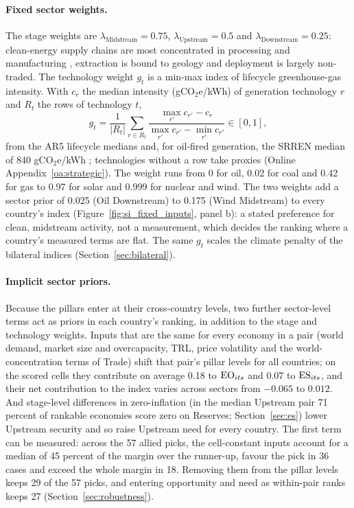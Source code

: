 \paragraph{Fixed sector weights.} The stage weights are $\lambda_{\mathrm{Midstream}}=0.75$,
$\lambda_{\mathrm{Upstream}}=0.5$ and $\lambda_{\mathrm{Downstream}}=0.25$: clean-energy supply chains
are most concentrated in processing and manufacturing \citep{iea2021role,iea2024etp}, extraction is
bound to geology and deployment is largely non-traded. The technology weight $g_t$ is a min-max index of
lifecycle greenhouse-gas intensity. With $c_r$ the median intensity (gCO$_2$e/kWh) of generation
technology $r$ and $R_t$ the rows of technology $t$,
\begin{equation}\label{eq:ghg_index}
  g_t=\frac{1}{|R_t|}\sum_{r\in R_t}\frac{\max_{r'}c_{r'}-c_r}{\max_{r'}c_{r'}-\min_{r'}c_{r'}}\in[0,1],
\end{equation}
from the AR5 lifecycle medians \citep{schlomer2014annex} and, for oil-fired generation, the SRREN
median of 840 gCO$_2$e/kWh \citep{moomaw2011annex}; technologies without a row take proxies (Online
Appendix~\ref{oa:strategic}). The weight runs from 0 for oil, 0.02 for coal and 0.42 for gas to 0.97
for solar and 0.999 for nuclear and wind. The two weights add a sector prior of 0.025 (Oil
Downstream) to 0.175 (Wind Midstream) to every country's index (Figure~\ref{fig:si_fixed_inputs},
panel b): a stated preference for clean, midstream activity, not a measurement, which decides the
ranking where a country's measured terms are flat. The same $g_t$ scales the climate penalty of the
bilateral indices (Section~\ref{sec:bilateral}).

\paragraph{Implicit sector priors.} Because the pillars enter at their cross-country levels, two
further sector-level terms act as priors in each country's ranking, in addition to the stage and
technology weights. Inputs that are the same for every economy in a pair (world demand, market size
and overcapacity, TRL, price volatility and the world-concentration terms of Trade) shift that
pair's pillar levels for all countries; on the scored cells they contribute on average 0.18 to
$\mathrm{EO}_{its}$ and 0.07 to $\mathrm{ES}_{its}$, and their net contribution to the index varies across sectors
from $-0.065$ to $0.012$. And stage-level differences in zero-inflation (in the median Upstream pair
71 percent of rankable economies score zero on Reserves; Section~\ref{sec:es}) lower Upstream
security and so raise Upstream need for every country. The first term can be measured: across the
57 allied picks, the cell-constant inputs account for a median of 45 percent of the margin over
the runner-up, favour the pick in 36 cases and exceed the whole margin in 18. Removing them from the
pillar levels keeps 29 of the 57 picks, and entering opportunity and need as within-pair ranks keeps
27 (Section~\ref{sec:robustness}).

